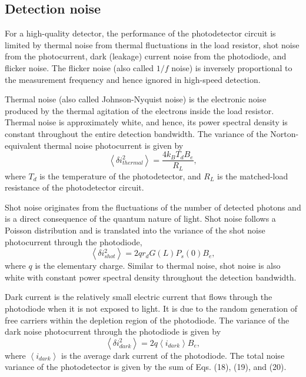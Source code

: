\subsection{Detection noise}

For a high-quality detector, the performance of the photodetector circuit is limited by thermal noise from thermal fluctuations in the load resistor, shot noise from the photocurrent, dark (leakage) current noise from the photodiode, and flicker noise. The flicker noise (also called $1/f$ noise) is inversely proportional to the measurement frequency and hence ignored in high-speed detection.

Thermal noise (also called Johnson-Nyquist noise) is the electronic noise produced by the thermal agitation of the electrons inside the load resistor. Thermal noise is approximately white, and hence, its power spectral density is constant throughout the entire detection bandwidth. The variance of the Norton-equivalent thermal noise photocurrent is given by
\begin{equation}
\left\langle \delta i_{thermal}^2\right\rangle = \frac{4 k_B T_d B_e}{R_L},
\end{equation}
where $T_d$ is the temperature of the photodetector, and $R_L$ is the matched-load resistance of the photodetector circuit.

Shot noise originates from the fluctuations of the number of detected photons and is a direct consequence of the quantum nature of light. Shot noise follows a Poisson distribution and is translated into the variance of the shot noise photocurrent through the photodiode,
\begin{equation}
\left\langle \delta i_{shot}^2\right\rangle = 2 q r_d G(L) P_s(0) B_e,
\end{equation}
where $q$ is the elementary charge. Similar to thermal noise, shot noise is also white with constant power spectral density throughout the detection bandwidth.

Dark current is the relatively small electric current that flows through the photodiode when it is not exposed to light. It is due to the random generation of free carriers within the depletion region of the photodiode. The variance of the dark noise photocurrent through the photodiode is given by
\begin{equation}
\left\langle \delta i_{dark}^2\right\rangle = 2 q \left\langle i_{dark}\right\rangle B_e,
\end{equation}
where $\left\langle i_{dark}\right\rangle$ is the average dark current of the photodiode. The total noise variance of the photodetector is given by the sum of Eqs. (18), (19), and (20).

